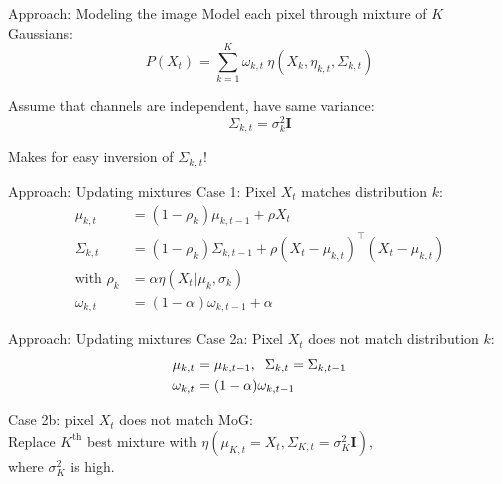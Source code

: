 \documentclass{beamer}
\begin{document}
\begin{frame}{Approach: Modeling the image}
Model each pixel through mixture of $K$ Gaussians:
\begin{equation*}
P(X_t) = \sum^K_{k=1} \omega_{k,t}~\eta
	(X_k, \eta_{k, t}, \Sigma_{k,t})
\end{equation*} %

Assume that channels are independent, have same variance:
\begin{equation*}
\Sigma_{k,t} = \sigma_k^2 \textbf{I}
\end{equation*}

Makes for easy inversion of $\Sigma_{k,t}$! %
\end{frame}

\begin{frame}{Approach: Updating mixtures}
Case 1: Pixel $X_t$ matches distribution $k$: \vspace{-3mm}
\begin{align*}
  \mu_{k,t} &= (1 - \rho_k) \mu_{k, t-1} + \rho X_t \\
  \Sigma_{k,t} &= (1 - \rho_k) \Sigma_{k,t-1} + \rho (X_t - \mu_{k,t})^\top (X_t - \mu_{k,t}) \\
\text{with }  \rho_k &= \alpha \eta(X_t | \mu_k , \sigma_k) \\
\omega_{k,t} &= (1-\alpha) \omega_{k,t-1} + \alpha 
\end{align*}
\end{frame}

\begin{frame}{Approach: Updating mixtures}
Case 2a: Pixel $X_t$ does not match distribution $k$: \vspace{-3mm}
\begin{align*}
  \mu_{k,t} &= \mu_{k, t-1} , \hspace{2mm} \Sigma_{k,t} =  \Sigma_{k,t-1} \\
\omega_{k,t} &= (1-\alpha) \omega_{k,t-1}
\end{align*}

Case 2b: pixel $X_t$ does not match MoG: \\
      \hspace{1cm} Replace $K^{\text{th}}$ best mixture with $\eta(\mu_{K,t}=X_t, \Sigma_{K,t}=\sigma^2_{K} \textbf{I})$, \\
      \hspace{1cm} where $\sigma^2_K$ is high.
\end{frame}
\end{document}

